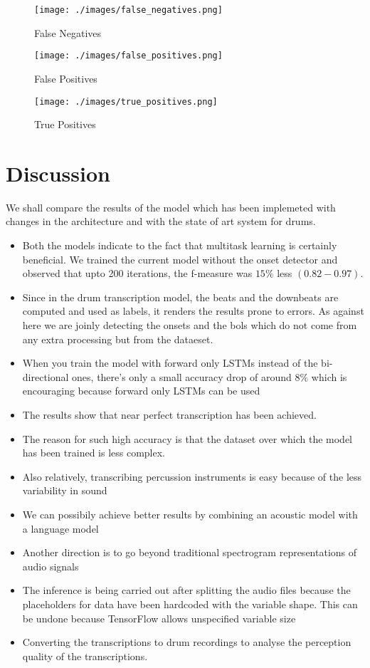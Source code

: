 \begin{figure}[h!]
  \texttt{[image: ./images/false\_negatives.png]}
  \caption{False Negatives}
  \label{}
\end{figure}

\begin{figure}[h!]
  \texttt{[image: ./images/false\_positives.png]}
  \caption{False Positives}
  \label{}
\end{figure}

\begin{figure}[h!]
  \texttt{[image: ./images/true\_positives.png]}
  \caption{True Positives}
  \label{}
\end{figure}
 

\section*{Discussion}
We shall compare the results of the model which has been implemeted with changes in the architecture and with the state of art system for drums.
\begin{itemize}
\item Both the models indicate to the fact that multitask learning is certainly beneficial. We trained the current model without the onset detector and observed that upto 200 iterations, the f-measure was $15\%$ less $(0.82-0.97)$.
\item Since in the drum transcription model, the beats and the downbeats are computed and used as labels, it renders the results prone to errors. As against here we are joinly detecting the onsets and the bols which do not come from any extra processing but from the dataeset.
\item When you train the model with forward only LSTMs instead of the bi-directional ones, there’s only a small accuracy drop of around
  $8\%$ which is encouraging because forward only LSTMs can be used
\item The results show that near perfect transcription has been achieved.
\item The reason for such high accuracy is that the dataset over which the model has been trained is less complex.
\item Also relatively, transcribing percussion instruments is easy because of the less variability in sound
\item We can possibily achieve better results by combining an acoustic model with a language model
\item Another direction is to go beyond traditional spectrogram representations of audio signals
\item The inference is being carried out after splitting the audio files because the placeholders for data have been hardcoded with the variable shape. This can be undone because TensorFlow allows unspecified variable size
\item Converting the transcriptions to drum recordings to analyse the perception quality of the transcriptions.
\end{itemize}  